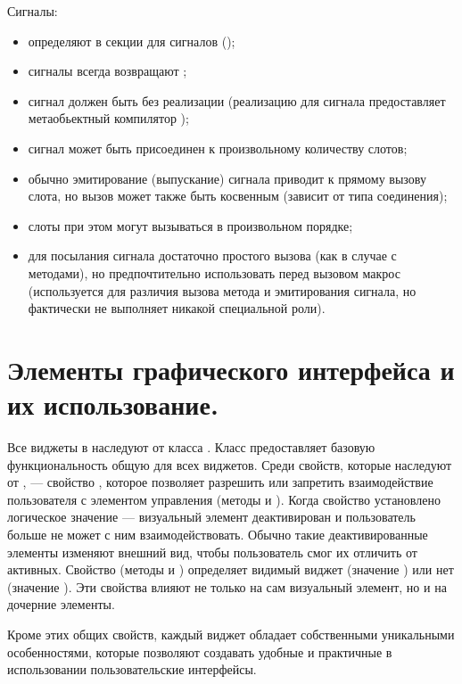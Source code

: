 Сигналы:
\begin{itemize}
\item определяют в секции для сигналов ();
\item сигналы всегда возвращают ;
\item сигнал должен быть без реализации (реализацию для сигнала предоставляет метаобьектный компилятор );
\item сигнал может быть присоединен к произвольному количеству слотов;
\item обычно эмитирование (выпускание) сигнала приводит к прямому вызову слота, но вызов может также быть косвенным
(зависит от типа соединения);
\item слоты при этом могут вызываться в произвольном порядке;
\item для посылания сигнала достаточно простого вызова (как в случае с методами), но предпочтительно использовать перед
вызовом макрос  (используется для различия вызова метода и эмитирования сигнала, но фактически не
выполняет никакой специальной роли).
\end{itemize}

\section[Элементы графического интерфейса.]{Элементы графического интерфейса и их использование.
}
Все виджеты в  наследуют от класса . Класс  предоставляет базовую
функциональность общую для всех виджетов. Среди свойств, которые наследуют от , --- свойство
, которое позволяет разрешить или запретить взаимодействие пользователя с элементом управления (методы
 и ). Когда свойство установлено логическое значение
 --- визуальный элемент деактивирован и пользователь больше не может с ним взаимодействовать. Обычно такие
деактивированные элементы изменяют внешний вид, чтобы пользователь смог их отличить от активных. Свойство
 (методы  и ) определяет видимый виджет
(значение ) или нет (значение ). Эти свойства влияют не только на сам визуальный элемент, но
и на дочерние элементы.

Кроме этих общих свойств, каждый виджет обладает собственными уникальными особенностями, которые позволяют создавать
удобные и практичные в использовании пользовательские интерфейсы.

